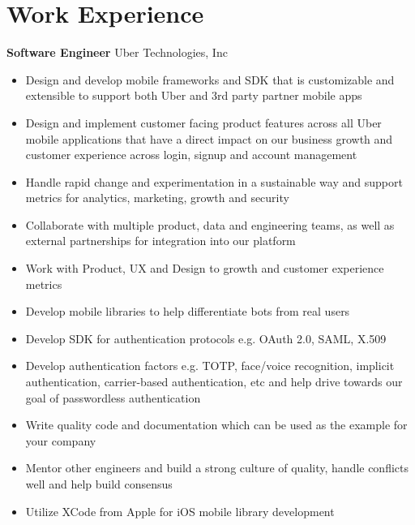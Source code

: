 \documentclass[12pt,letterpaper,sans]{moderncv}        %
\begin{document}
\makecvtitle

\section{Work Experience}

{\textbf{Software Engineer}}
{Uber Technologies, Inc}{}{}{
\begin{itemize}
\item Design and develop mobile frameworks and SDK that is customizable and extensible to support both Uber and 3rd party partner mobile apps
\item Design and implement customer facing product features across all Uber mobile applications that have a direct impact on our business growth and customer experience across login, signup and account management
\item Handle rapid change and experimentation in a sustainable way and support metrics for analytics, marketing, growth and security
\item Collaborate with multiple product, data and engineering teams, as well as external partnerships for integration into our platform
\item Work with Product, UX and Design to growth and customer experience metrics
\item Develop mobile libraries to help differentiate bots from real users
\item Develop SDK for authentication protocols e.g. OAuth 2.0, SAML, X.509
\item Develop authentication factors e.g. TOTP, face/voice recognition, implicit authentication, carrier-based authentication, etc and help drive towards our goal of passwordless authentication
\item Write quality code and documentation which can be used as the example for your company
\item Mentor other engineers and build a strong culture of quality, handle conflicts well and help build consensus
\item Utilize XCode from Apple for iOS mobile library development
\end{itemize}} 
\end{document}
